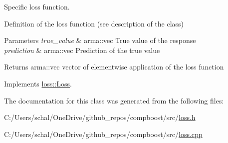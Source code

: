 Specific loss function. 

Definition of the loss function (see description of the class)


\begin{DoxyParams}{Parameters}
{\em true\+\_\+value} & {\ttfamily arma\+::vec} True value of the response \\
\hline
{\em prediction} & {\ttfamily arma\+::vec} Prediction of the true value\\
\hline
\end{DoxyParams}
\begin{DoxyReturn}{Returns}
{\ttfamily arma\+::vec} vector of elementwise application of the loss function 
\end{DoxyReturn}


Implements \mbox{\hyperlink{classloss_1_1_loss_ae9f94dd9b8311397583ba3a9cb485e94}{loss\+::\+Loss}}.



The documentation for this class was generated from the following files\+:\begin{DoxyCompactItemize}
\item 
C\+:/\+Users/schal/\+One\+Drive/github\+\_\+repos/compboost/src/\mbox{\hyperlink{loss_8h}{loss.\+h}}\item 
C\+:/\+Users/schal/\+One\+Drive/github\+\_\+repos/compboost/src/\mbox{\hyperlink{loss_8cpp}{loss.\+cpp}}\end{DoxyCompactItemize}

